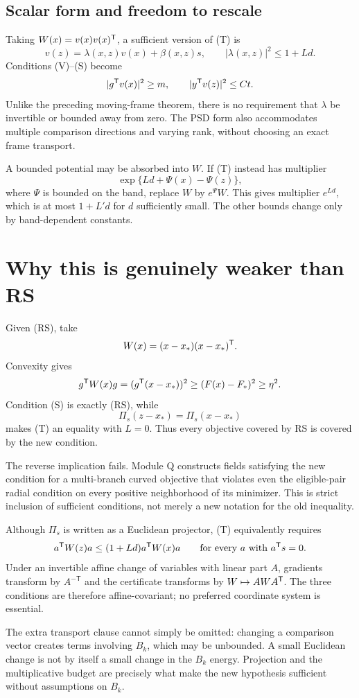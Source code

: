\subsection{Scalar form and freedom to rescale}
Taking $W(x)=v(x)v(x)^{\mathsf T}$, a sufficient version of (T) is
\[
 v(z)=\lambda(x,z)v(x)+\beta(x,z)s,\qquad
 |\lambda(x,z)|^2\le1+L d.
\]
Conditions (V)--(S) become
\[
 |g^{\mathsf T} v(x)|^2\ge m,\qquad |y^{\mathsf T} v(z)|^2\le Ct.
\]
Unlike the preceding moving-frame theorem, there is no requirement that $\lambda$ be invertible or bounded away from zero. The PSD form also accommodates multiple comparison directions and varying rank, without choosing an exact frame transport.

A bounded potential may be absorbed into $W$. If (T) instead has multiplier
\[
 \exp\{L d+\Psi(x)-\Psi(z)\},
\]
where $\Psi$ is bounded on the band, replace $W$ by $e^{\Psi}W$. This gives multiplier $e^{Ld}$, which is at most $1+L'd$ for $d$ sufficiently small. The other bounds change only by band-dependent constants.


\setcounter{section}{3}
\setcounter{theorem}{1}
\setcounter{lemma}{0}
\setcounter{corollary}{0}
\setcounter{proposition}{0}
\setcounter{remark}{0}
\setcounter{equation}{6}
\section{Why this is genuinely weaker than RS}
Given (RS), take
\[
 W(x)=(x-x_*)(x-x_*)^{\mathsf T}.
\]
Convexity gives
\[
 g^{\mathsf T} W(x)g=(g^{\mathsf T}(x-x_*))^2\ge(F(x)-F_*)^2\ge\eta^2.
\]
Condition (S) is exactly (RS), while
\[
 \Pi_s(z-x_*)=\Pi_s(x-x_*)
\]
makes (T) an equality with $L=0$. Thus every objective covered by RS is covered by the new condition.

The reverse implication fails. Module Q constructs fields satisfying the new condition for a multi-branch curved objective that violates even the eligible-pair radial condition on every positive neighborhood of its minimizer. This is strict inclusion of sufficient conditions, not merely a new notation for the old inequality.

Although $\Pi_s$ is written as a Euclidean projector, (T) equivalently requires
\[
 a^{\mathsf T} W(z)a\le(1+Ld)a^{\mathsf T} W(x)a\qquad\text{for every }a\text{ with }a^{\mathsf T} s=0.
\]
Under an invertible affine change of variables with linear part $A$, gradients transform by $A^{-\mathsf T}$ and the certificate transforms by $W\mapsto AWA^{\mathsf T}$. The three conditions are therefore affine-covariant; no preferred coordinate system is essential.

The extra transport clause cannot simply be omitted: changing a comparison vector creates terms involving $B_k$, which may be unbounded. A small Euclidean change is not by itself a small change in the $B_k$ energy. Projection and the multiplicative budget are precisely what make the new hypothesis sufficient without assumptions on $B_k$.


\endgroup

